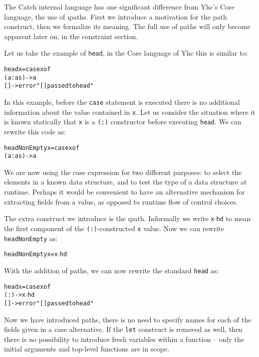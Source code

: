 \documentclass[preprint]{sigplanconf}
\newcommand{\T}[1]{\texttt{#1}}
\newenvironment{code}{\begin{alltt}\small}{\end{alltt}}
\newcommand{\D}{\ensuremath{\cdot}} %
\begin{document}
The Catch internal language has one significant difference from Yhc's Core
language, the use of \i{paths}. First we introduce a motivation for the path
construct, then we formalize its meaning. The full use of paths will only
become apparent later on, in the constraint section.

Let us take the example of \T{head}, in the Core language of Yhc this is
similar to:

\begin{code}
 head x = case x of
              (a:as) -> a
              [] -> error "[] passed to head"
\end{code}

In this example, before the \T{case} statement is executed there is no
additional information about the value contained in \T{x}. Let us consider the
situation where it is known statically that \T{x} is a \T{(:)} constructor
before executing \T{head}. We can rewrite this code as:

\begin{code}
 headNonEmpty x = case x of
                      (a:as) -> a
\end{code}

We are now using the case expression for two different purposes: to select the
elements in a known data structure, and to test the type of a data structure at
runtime. Perhaps it would be convenient to have an alternative mechanism for
extracting fields from a value, as opposed to runtime flow of control choices.

The extra construct we introduce is the \i{path}. Informally we write
\T{x\D{}hd} to mean the first component of the \T{(:)}-constructed \T{x} value.
Now we can rewrite \T{headNonEmpty} as:

\begin{code}
 headNonEmpty x = x\(\D\)hd
\end{code}

With the addition of paths, we can now rewrite the standard \T{head} as:

\begin{code}
 head x = case x of
            (:) -> x\(\D\)hd
            [] -> error "[] passed to head"
\end{code}

Now we have introduced paths, there is no need to specify names for each of the
fields given in a case alternative. If the \T{let} construct is removed as
well, then there is no possibility to introduce fresh variables within a
function -- only the initial arguments and top-level functions are in scope.
\end{document}

